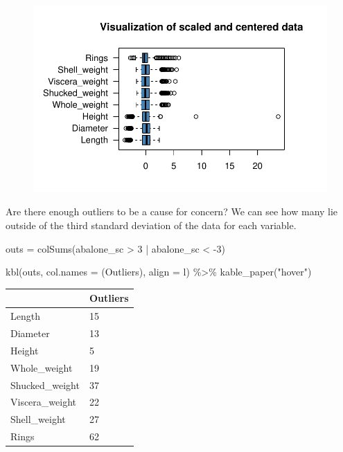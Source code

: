 \documentclass[
  letterpaper,
  DIV=11,
  numbers=noendperiod]{scrreprt}
\newenvironment{Shaded}{\begin{snugshade}}{\end{snugshade}}
\newcommand{\AttributeTok}[1]{\textcolor[rgb]{0.40,0.45,0.13}{#1}}
\newcommand{\DecValTok}[1]{\textcolor[rgb]{0.68,0.00,0.00}{#1}}
\newcommand{\FunctionTok}[1]{\textcolor[rgb]{0.28,0.35,0.67}{#1}}
\newcommand{\NormalTok}[1]{\textcolor[rgb]{0.00,0.23,0.31}{#1}}
\newcommand{\OtherTok}[1]{\textcolor[rgb]{0.00,0.23,0.31}{#1}}
\newcommand{\SpecialCharTok}[1]{\textcolor[rgb]{0.37,0.37,0.37}{#1}}
\newcommand{\StringTok}[1]{\textcolor[rgb]{0.13,0.47,0.30}{#1}}
\begin{document}
\begin{figure}[H]

{\centering \includegraphics{examples_files/figure-pdf/unnamed-chunk-5-1.pdf}

}

\end{figure}

Are there enough outliers to be a cause for concern? We can see how many
lie outside of the third standard deviation of the data for each
variable.

\begin{Shaded}
\begin{Highlighting}[]
\NormalTok{outs }\OtherTok{=} \FunctionTok{colSums}\NormalTok{(abalone\_sc }\SpecialCharTok{\textgreater{}} \DecValTok{3} \SpecialCharTok{|}\NormalTok{ abalone\_sc }\SpecialCharTok{\textless{}} \SpecialCharTok{{-}}\DecValTok{3}\NormalTok{)}

\FunctionTok{kbl}\NormalTok{(outs, }\AttributeTok{col.names =}\NormalTok{ (}\StringTok{\textquotesingle{}Outliers\textquotesingle{}}\NormalTok{), }\AttributeTok{align =} \StringTok{\textquotesingle{}l\textquotesingle{}}\NormalTok{) }\SpecialCharTok{\%\textgreater{}\%}
  \FunctionTok{kable\_paper}\NormalTok{(}\StringTok{"hover"}\NormalTok{)}
\end{Highlighting}
\end{Shaded}

\begin{table}
\centering
\begin{tabular}[t]{l|l}
\hline
  & Outliers\\
\hline
Length & 15\\
\hline
Diameter & 13\\
\hline
Height & 5\\
\hline
Whole\_weight & 19\\
\hline
Shucked\_weight & 37\\
\hline
Viscera\_weight & 22\\
\hline
Shell\_weight & 27\\
\hline
Rings & 62\\
\hline
\end{tabular}
\end{table}
\end{document}
